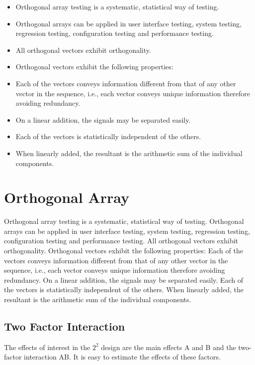 \documentclass[]{article}
\begin{document}
\newpage
\begin{itemize}
\item Orthogonal array testing is a systematic, statistical way of testing. 
\item Orthogonal arrays can be applied in user interface testing, system testing, regression testing, configuration testing and performance testing.
\item All orthogonal vectors exhibit orthogonality. 
\item Orthogonal vectors exhibit the following properties:
\item Each of the vectors conveys information different from that of any other vector in the sequence, i.e., each vector conveys unique information therefore avoiding redundancy.
\item On a linear addition, the signals may be separated easily.
\item Each of the vectors is statistically independent of the others.
\item When linearly added, the resultant is the arithmetic sum of the individual components.
\end{itemize}

%
%
%
\newpage

\section{Orthogonal Array}
Orthogonal array testing is a systematic, statistical way of testing. Orthogonal arrays can be applied in user interface testing, system testing, regression testing, configuration testing and performance testing.
All orthogonal vectors exhibit orthogonality. Orthogonal vectors exhibit the following properties:
Each of the vectors conveys information different from that of any other vector in the sequence, i.e., each vector conveys unique information therefore avoiding redundancy.
On a linear addition, the signals may be separated easily.
Each of the vectors is statistically independent of the others.
When linearly added, the resultant is the arithmetic sum of the individual components.


\subsection{Two Factor Interaction}
The effects of interest in the $2^2$ design are the  main effects A and B and the two-factor interaction AB. It is easy to estimate the effects of these factors.
\end{document}
